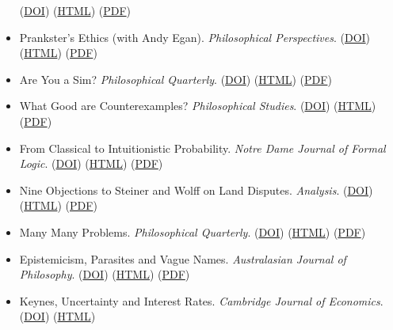 \documentclass[
  10pt,
  letterpaper,
  DIV=11,
  numbers=noendperiod,
  twoside]{scrartcl}
\begin{document}
\begin{itemize}
  (\href{http://dx.doi.org/10.5840/monist200487316}{DOI})
  (\href{./posts/gunk/chopping-up-gunk.html}{HTML})
  (\href{./posts/gunk/Chopping\%20Up\%20Gunk.pdf}{PDF})
\item
  Prankster's Ethics (with Andy Egan). \emph{Philosophical
  Perspectives}.
  (\href{http://dx.doi.org/10.1111/j.1520-8583.2004.00020.x}{DOI})
  (\href{./posts/prank/pranksters-ethics.html}{HTML})
  (\href{./posts/prank/Pranksters'\%20Ethics.pdf}{PDF})
\item
  Are You a Sim? \emph{Philosophical Quarterly}.
  (\href{http://dx.doi.org/10.1111/1467-9213.00323}{DOI})
  (\href{./posts/sims/are-you-a-sim.html}{HTML})
  (\href{./posts/sims/Are\%20You\%20a\%20Sim?.pdf}{PDF})
\item
  What Good are Counterexamples? \emph{Philosophical Studies}.
  (\href{https://doi.org/10.1023/A:1024961917413}{DOI})
  (\href{./posts/wgac/what-good-are-counterexamples.html}{HTML})
  (\href{./posts/wgac/What\%20Good\%20are\%20Counterexamples?.pdf}{PDF})
\item
  From Classical to Intuitionistic Probability. \emph{Notre Dame Journal
  of Formal Logic}.
  (\href{http://dx.doi.org/10.1305/ndjfl/1082637807}{DOI})
  (\href{./posts/conprob/from-classical-to-intuitionistic-probability.html}{HTML})
  (\href{./posts/conprob/From\%20Classical\%20to\%20Intuitionistic\%20Probability.pdf}{PDF})
\item
  Nine Objections to Steiner and Wolff on Land Disputes.
  \emph{Analysis}.
  (\href{http://dx.doi.org/10.1093/analys/63.4.321}{DOI})
  (\href{./posts/nine-obj/nine-objections-to-steiner-and-wolff-on-land-disputes.html}{HTML})
  (\href{./posts/nine-obj/Nine\%20Objections\%20to\%20Steiner\%20and\%20Woolf\%20on\%20Land\%20Disputes.pdf}{PDF})
\item
  Many Many Problems. \emph{Philosophical Quarterly}.
  (\href{http://dx.doi.org/10.1111/1467-9213.00327}{DOI})
  (\href{./posts/mmp/many-many-problems.html}{HTML})
  (\href{./posts/mmp/Many\%20Many\%20Problems.pdf}{PDF})
\item
  Epistemicism, Parasites and Vague Names. \emph{Australasian Journal of
  Philosophy}. (\href{http://dx.doi.org/10.1093/ajp/jag209}{DOI})
  (\href{./posts/epvn/epistemicism-parasites-and-vague-names.html}{HTML})
  (\href{./posts/epvn/Epistemicism,\%20Parasites\%20and\%20Vague\%20Names.pdf}{PDF})
\item
  Keynes, Uncertainty and Interest Rates. \emph{Cambridge Journal of
  Economics}. (\href{http://dx.doi.org/10.1093/cje/26.1.47}{DOI})
  (\href{./posts/kuir/keynes-uncertainty-and-interest-rates.html}{HTML})

\end{itemize}
\end{document}
